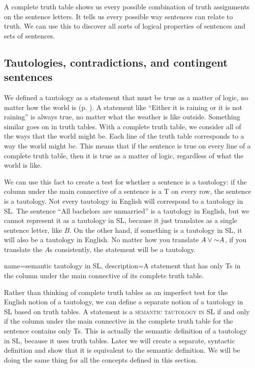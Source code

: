 A complete truth table shows us every possible combination of truth assignments on the sentence letters. It tells us every possible way sentences can relate to truth. We can use this to discover all sorts of logical properties of sentences and sets of sentences. 

\subsection{Tautologies, contradictions, and contingent sentences}
We defined a tautology as a statement that must be true as a matter of logic, no matter how the world is (p. \pageref{def:tautology}). A statement like ``Either it is raining or it is not raining'' is always true, no matter what the weather is like outside. Something similar goes on in truth tables. With a complete truth table, we consider all of the ways that the world might be. Each line of the truth table corresponds to a way the world might be. This means that if the sentence is true on every line of a complete truth table, then it is true as a matter of logic, regardless of what the world is like.

We can use this fact to create a test for whether a sentence is a tautology: if the column under the main connective of a sentence is a T on every row, the sentence is a tautology. Not every tautology in English will correspond to a tautology in SL. The sentence ``All bachelors are unmarried'' is a tautology in English, but we cannot represent it as a tautology in SL, because it just translates as a single sentence letter, like $B$. On the other hand, if something is a tautology in SL, it will also be a tautology in English. No matter how you translate $A \vee \mathord{\sim} A$, if you translate the $A$s consistently, the statement will be a tautology. 

{
name=semantic tautology in SL,
description={A statement that has only Ts in the column under the main connective of its complete truth table.}
}

\label{semantic_definitions_in_SL}
Rather than thinking of complete truth tables as an imperfect test for the English notion of a tautology, we can define a separate notion of a tautology in SL based on truth tables. A statement is a \textsc{\gls{semantic tautology in SL}} \label{def:semantic_tautology_in_sl} if and only if the column  under the main connective in the complete truth table for the sentence contains only Ts. This is actually the semantic definition of a tautology in SL, because it uses truth tables. Later we will create a separate, syntactic definition and show that it is equivalent to the semantic definition. We will be doing the same thing for all the concepts defined in this section. 

